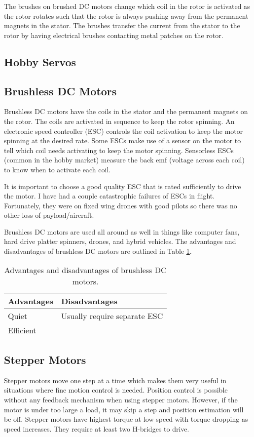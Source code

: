 The brushes on brushed DC motors change which coil in the rotor is activated as the rotor rotates such 
that the rotor is always pushing away from the permanent magnets in the stator. The brushes transfer 
the current from the stator to the rotor by having electrical brushes contacting metal patches on the 
rotor.

\subsection{Hobby Servos}

\subsection{Brushless DC Motors}
Brushless DC motors have the coils in the stator and the permanent magnets on the rotor. The coils are 
activated in sequence to keep the rotor spinning. An electronic speed controller (ESC) controls the 
coil activation to keep the motor spinning at the desired rate. Some ESCs make use of a sensor on the 
motor to tell which coil needs activating to keep the motor spinning. Sensorless ESCs (common in the 
hobby market) measure the back emf (voltage across each coil) to know when to activate each coil.

It is important to choose a good quality ESC that is rated sufficiently to drive the motor. I have had 
a couple catastrophic failures of ESCs in flight. Fortunately, they were on fixed wing drones with 
good pilots so there was no other loss of payload/aircraft. 

Brushless DC motors are used all around as well in things like computer fans, hard drive platter spinners,
 drones, and hybrid vehicles. The advantages and disadvantages of brushless DC motors are outlined in 
 Table \ref{table:dcbrushless}.

 \begin{table}[!ht]
	\centering
	\begin{tabular}{l l}
		\hline
		Advantages & Disadvantages \\ 
		\hline
		Quiet & Usually require separate ESC \\
		Efficient & \\
		\hline
	\end{tabular}
	\caption{Advantages and disadvantages of brushless DC motors.}
	\label{table:dcbrushless}
\end{table}

\subsection{Stepper Motors}
Stepper motors move one step at a time which makes them very useful in situations where fine motion control 
is needed. Position control is possible without any feedback mechanism when using stepper motors. However, 
if the motor is under too large a load, it may skip a step and position estimation will be off. Stepper 
motors have highest torque at low speed with torque dropping as speed increases. They require at least 
two H-bridges to drive. 

